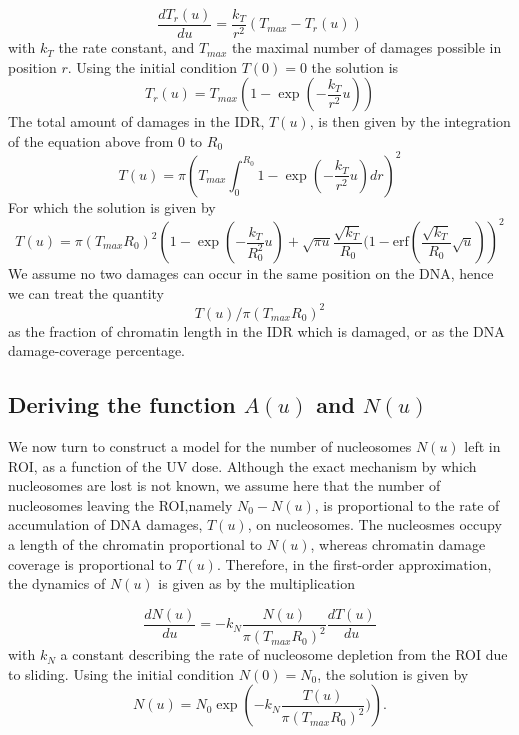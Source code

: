\documentclass[12pt]{article}
\newcommand{\erf}{\mbox{erf}}
\begin{document}
\begin{equation}
\frac{dT_r(u)}{du}=\frac{k_T}{r^2}\left(T_{max}-T_r(u)\right)
\end{equation}
with $k_T$ the rate constant, and $T_{max}$ the maximal number of damages possible in position $r$. 
Using the initial condition $T(0) = 0$ the solution is
\begin{equation}
T_r(u) = T_{max}\left(1-\exp(-\frac{k_T}{r^2} u)\right) 
\end{equation}
The total amount of damages in the IDR, $T(u)$, is then given by the integration of the equation above from $0$ to $R_0$
\begin{equation}
T(u) = \pi \left(T_{max} \int_0^{R_0}  1-\exp\left(-\frac{k_T}{r^2} u\right) dr\right)^2
\end{equation}
For which the solution is given by 
\begin{equation}
T(u) = \pi(T_{max}R_0)^2 \left(1-\exp(-\frac{k_T}{R_0^2}u)+\sqrt{\pi u}\frac{\sqrt{ k_T}}{R_0}(1-\erf \left(\frac{\sqrt{k_T}}{R_0} \sqrt{u}\right)\right)^2
\end{equation}
We assume no two damages can occur in the same position on the DNA, hence we can treat the quantity 
\begin{equation*}
T(u)/\pi(T_{max}R_0)^2 
\end{equation*}
as the fraction of chromatin length in the IDR which is damaged, or as the DNA damage-coverage percentage. 

\subsection{Deriving the function $A(u)$ and $N(u)$}
We now turn to construct a model for the number of nucleosomes $N(u)$ left in ROI, as a function of the UV dose. Although the exact mechanism by which nucleosomes are lost is not known, we assume here that the number of nucleosomes leaving the ROI,namely  $N_0-N(u)$, is proportional to the rate of accumulation of DNA damages, $T(u)$, on nucleosomes. The nucleosmes occupy a length of the chromatin proportional to $N(u)$, whereas chromatin damage coverage is proportional to $T(u)$. Therefore, in the first-order approximation, the dynamics of $N(u)$ is given as by the multiplication 

\begin{equation*}
\frac{dN(u)}{du} = -k_N\frac{N(u)}{\pi(T_{max}R_0)^2 }\frac{dT(u)}{du}
\end{equation*}
with $k_N$ a constant describing the rate of nucleosome depletion from the ROI due to sliding. Using the initial condition $N(0) = N_0$, the solution is given by
\begin{equation}\label{eq:NumHistones}
N(u) = N_0\exp\left(-k_N\frac{T(u)}{\pi(T_{max}R_0)^2})\right).
\end{equation}
\end{document}
